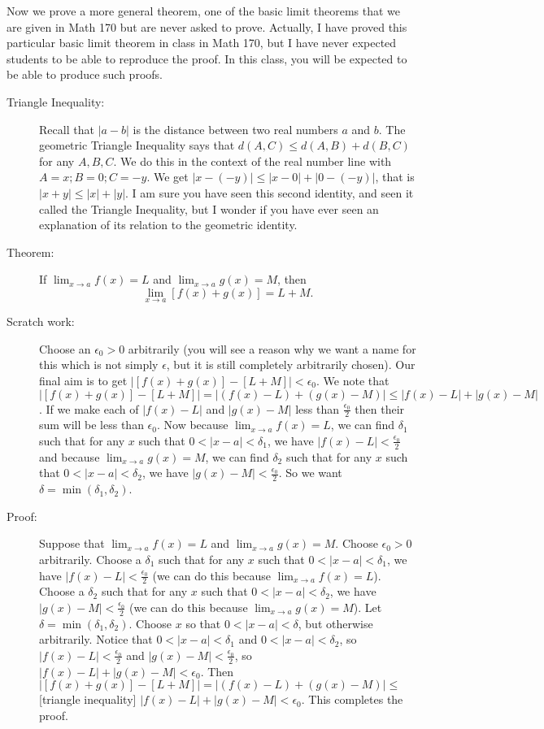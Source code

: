 \documentclass[12pt]{article}
\begin{document}
Now we prove a more general theorem, one of the basic limit theorems that we are given in Math 170 but are never asked to prove.  Actually, I have proved this particular basic limit theorem in class in Math 170, but I have never expected students to be able to reproduce the proof.  In this class, you will be expected to be able to produce such proofs.

\begin{description}

\item[Triangle Inequality:]  Recall that $|a-b|$ is the distance between two real numbers $a$ and $b$.  The geometric Triangle Inequality says
that $d(A,C) \leq d(A,B)+d(B,C)$ for any $A,B,C$.  We do this in the context of the real number line with $A=x; B=0; C=-y$.
We get $|x-(-y)| \leq |x-0| + |0-(-y)|$, that is $|x+y| \leq |x|+|y|$.  I am sure you have seen this second identity, and seen it called the Triangle Inequality, but I wonder if you have ever seen an explanation of its relation to the geometric identity.

\item[Theorem:]  If $\lim_{x \rightarrow a}f(x)=L$ and $\lim_{x \rightarrow a}g(x)=M$, then $$\lim_{x \rightarrow a}[f(x)+g(x)]=L+M.$$

\item[Scratch work:]  Choose an $\epsilon_0>0$ arbitrarily (you will see a reason why we want a name for this which is not simply $\epsilon$, but it is still completely arbitrarily chosen).  Our final aim is to get $|[f(x)+g(x)]-[L+M]|<\epsilon_0$.  We note that $|[f(x)+g(x)]-[L+M]| = |(f(x)-L)+(g(x)-M)| \leq |f(x)-L| + |g(x)-M|$.  If we make each of $|f(x)-L|$ and $|g(x)-M|$ less than $\frac{\epsilon_0}2$ then their sum will be less than $\epsilon_0$.  Now because $\lim_{x\rightarrow a}f(x)=L$, we can find $\delta_1$ such that for any $x$ such that $0<|x-a|<\delta_1$, we have $|f(x)-L|<\frac{\epsilon_0}2$ and because $\lim_{x\rightarrow a}g(x)=M$, we can find $\delta_2$ such that for any $x$ such that $0<|x-a|<\delta_2$, we have $|g(x)-M|<\frac{\epsilon_0}2$.  So we want $\delta=\min(\delta_1,\delta_2)$.

\item[Proof:]  Suppose that  $\lim_{x \rightarrow a}f(x)=L$ and $\lim_{x \rightarrow a}g(x)=M$.  Choose $\epsilon_0>0$ arbitrarily.
Choose a  $\delta_1$ such that for any $x$ such that $0<|x-a|<\delta_1$, we have $|f(x)-L|<\frac{\epsilon_0}2$ (we can do this because $\lim_{x \rightarrow a}f(x)=L$). Choose a  $\delta_2$ such that for any $x$ such that $0<|x-a|<\delta_2$, we have $|g(x)-M|<\frac{\epsilon_0}2$ (we can do this because $\lim_{x \rightarrow a}g(x)=M$).  Let $\delta = \min(\delta_1,\delta_2)$.  Choose $x$ so that $0<|x-a|<\delta$, but otherwise arbitrarily.
Notice that $0<|x-a|<\delta_1$ and $0<|x-a|<\delta_2$, so $|f(x)-L|<\frac{\epsilon_0}2$ and $|g(x)-M|<\frac{\epsilon_0}2$, so $|f(x)-L|+|g(x)-M|<\epsilon_0$.  Then $|[f(x)+g(x)]-[L+M]| = |(f(x)-L)+(g(x)-M)| \leq$ [triangle inequality] $|f(x)-L| + |g(x)-M|<\epsilon_0$.  This completes the proof.

\end{description}
\end{document}
